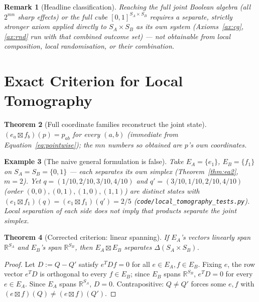 \documentclass[11pt,a4paper]{article}
\newtheorem{theorem}{Theorem}[section]
\newtheorem{remark}[theorem]{Remark}
\newtheorem{example}[theorem]{Example}
\newcommand{\SA}{S_A}
\newcommand{\SB}{S_B}
\begin{document}
    \begin{remark}[Headline classification]
      \label{rem:bc5}
      Reaching the full joint Boolean algebra (all $2^{mn}$ sharp effects) or the full cube
      $[0,1]^{\SA \times \SB}$ requires a separate, strictly stronger axiom applied directly to
      $\SA \times \SB$ as its own system (Axioms~\ref{ax:cg}, \ref{ax:rnd} run with that combined outcome
      set) --- not obtainable from local composition, local randomisation, or their combination.
    \end{remark}

  \section{Exact Criterion for Local Tomography}
  \label{sec:tomography}

    \begin{theorem}[Full coordinate families reconstruct the joint state]
      \label{thm:lt1}
      $(e_a \boxtimes f_b)(p) = p_{ab}$ for every $(a,b)$ (immediate from Equation~\eqref{eq:pointwise}); the
      $mn$ numbers so obtained are $p$'s own coordinates.
    \end{theorem}

    \begin{example}[The naive general formulation is false]
      \label{ex:lt2}
      Take $E_A = \{e_1\}$, $E_B = \{f_1\}$ on $\SA = \SB = \{0,1\}$ --- each separates its own simplex
      (Theorem~\ref{thm:ea2}, $m=2$).
      Yet $q = (1/10, 2/10, 3/10, 4/10)$ and $q' = (3/10, 1/10, 2/10, 4/10)$ (order $(0,0),(0,1),(1,0),(1,1)$)
      are distinct states with $(e_1 \boxtimes f_1)(q) = (e_1 \boxtimes f_1)(q') = 2/5$
      (\texttt{code/local\_tomography\_tests.py}).
      Local separation of each side does not imply that products separate the joint simplex.
    \end{example}

    \begin{theorem}[Corrected criterion: linear spanning]
      \label{thm:lt3}
      If $E_A$'s vectors linearly span $\mathbb{R}^{\SA}$ and $E_B$'s span $\mathbb{R}^{\SB}$, then
      $E_A \boxtimes E_B$ separates $\Delta(\SA \times \SB)$.
    \end{theorem}

    \begin{proof}
      Let $D := Q - Q'$ satisfy $e^T D f = 0$ for all $e \in E_A, f \in E_B$.
      Fixing $e$, the row vector $e^T D$ is orthogonal to every $f \in E_B$; since $E_B$ spans
      $\mathbb{R}^{\SB}$, $e^T D = 0$ for every $e \in E_A$.
      Since $E_A$ spans $\mathbb{R}^{\SA}$, $D = 0$.
      Contrapositive: $Q \neq Q'$ forces some $e,f$ with $(e \boxtimes f)(Q) \neq (e \boxtimes f)(Q')$.
    \end{proof}
\end{document}
